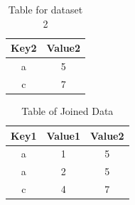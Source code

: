 \begin{table}[h!]
\centering
 \begin{tabular}{|c |c|}
  \hline
   Key2 & Value2 \\
  \hline
   a & 5 \\
  \hline
   c & 7 \\
  \hline
\end{tabular}
\caption{Table for dataset 2}
\label{table:join2}
\end{table}

\begin{table}[h!]
\centering
 \begin{tabular}{|c |c |c|}
  \hline
   Key1 & Value1 & Value2  \\
  \hline
   a & 1 & 5 \\
  \hline
   a & 2 & 5 \\
  \hline
   c & 4 & 7 \\
  \hline
\end{tabular}
\caption{Table of Joined Data}
\label{table:join3}
\end{table}



